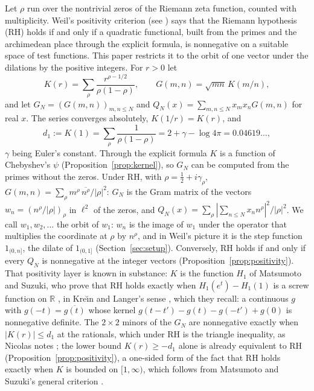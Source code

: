 \documentclass[11pt]{article}
\theoremstyle{definition}
\newcommand{\KH}{K}
\begin{document}
Let $\rho$ run over the nontrivial zeros of the Riemann zeta function, counted with multiplicity. Weil's positivity
criterion \cite{weil52} (see \cite{bombieri00}) says that the Riemann hypothesis (RH) holds if and only if a quadratic
functional, built from
the primes and the archimedean place through the explicit formula, is nonnegative on a suitable space of test
functions. This paper restricts it to the orbit of one vector
under the dilations by the positive integers. For $r > 0$ let
\begin{equation}\label{eq:K}
\KH(r) = \sum_\rho \frac{r^{\rho - 1/2}}{\rho(1 - \rho)}, \qquad G(m, n) = \sqrt{mn}\,\KH(m/n),
\end{equation}
and let $G_N = (G(m, n))_{m, n \le N}$ and $Q_N(x) = \sum_{m, n \le N} x_m x_n G(m, n)$ for real $x$. The series
converges absolutely, $\KH(1/r) = \KH(r)$, and
\begin{equation}\label{eq:d1}
d_1 := \KH(1) = \sum_\rho \frac{1}{\rho(1 - \rho)} = 2 + \gamma - \log 4\pi = 0.04619\ldots,
\end{equation}
$\gamma$ being Euler's constant. Through the explicit formula $\KH$ is a function of Chebyshev's $\psi$
(Proposition~\ref{prop:kernel}), so $G_N$ can be computed from the primes without the zeros. Under RH, with $\rho =
\tfrac12 + i\gamma_\rho$, $G(m, n) = \sum_\rho m^\rho\,\overline{n^\rho}/|\rho|^2$: $G_N$ is the Gram matrix of the
vectors $w_n = (n^\rho/|\rho|)_\rho$ in $\ell^2$ of the zeros, and $Q_N(x) = \sum_\rho |\sum_{n \le N} x_n n^\rho|^2 /
|\rho|^2$. We call $w_1, w_2, \dots$ the orbit of $w_1$: $w_n$ is the image of $w_1$ under the operator that
multiplies the coordinate at $\rho$ by $n^\rho$, and in Weil's picture it is the step function $1_{(0, n]}$, the
dilate of $1_{(0, 1]}$ (Section~\ref{sec:setup}). Conversely, RH holds if and only if every $Q_N$ is nonnegative at the
integer vectors (Proposition~\ref{prop:positivity}). That positivity layer is known in substance: $\KH$ is the function
$H_1$ of Matsumoto and Suzuki, who prove that RH holds exactly when $H_1(e^t) - H_1(1)$ is a screw function on
$\mathbb R$ \cite[Theorem~1.3]{matsumoto-suzuki}, in Kre\u{\i}n and Langer's sense \cite{krein-langer}, which they
recall: a continuous $g$ with $g(-t) = \overline{g(t)}$ whose kernel $g(t - t') - g(t) - g(-t') + g(0)$ is nonnegative
definite. The $2 \times 2$ minors of the $G_N$ are nonnegative exactly when $|\KH(r)| \le d_1$ at the rationals, which
under RH is the triangle inequality, as Nicolas notes \cite{nicolas}; the lower bound $\KH(r) \ge -d_1$ alone is
already equivalent to RH (Proposition~\ref{prop:positivity}), a one-sided form of the fact that RH holds exactly when
$\KH$ is bounded on $[1, \infty)$, which follows from Matsumoto and Suzuki's general criterion
\cite[Corollary~3.1]{matsumoto-suzuki}.
\end{document}
